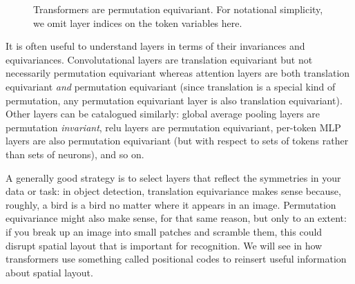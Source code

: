 \begin{figure}[h]
{\begin{minipage}{.19\linewidth}
        \end{minipage}
    }
    \caption{Transformers are permutation equivariant. For notational simplicity, we omit layer indices on the token variables here.}
    \label{fig:transformers:permutation_equivariance}
\end{figure}

It is often useful to understand layers in terms of their invariances and equivariances. Convolutational layers are translation equivariant but not necessarily permutation equivariant whereas attention layers are both translation equivariant \textit{and} permutation equivariant (since translation is a special kind of permutation, any permutation equivariant layer is also translation equivariant). %
Other layers can be catalogued similarly: global average pooling layers are permutation \textit{invariant}, relu layers are permutation equivariant, per-token MLP layers are also permutation equivariant (but with respect to sets of tokens rather than sets of neurons), and so on. %

A generally good strategy is to select layers that reflect the symmetries in your data or task: in object detection, translation equivariance makes sense because, roughly, a bird is a bird no matter where it appears in an image. Permutation equivariance might also make sense, for that same reason, but only to an extent: if you break up an image into small patches and scramble them, this could disrupt spatial layout that is important for recognition. We will see in \sect{\ref{sec:transformers:positional_encodings}} how transformers use something called positional codes to reinsert useful information about spatial layout.

